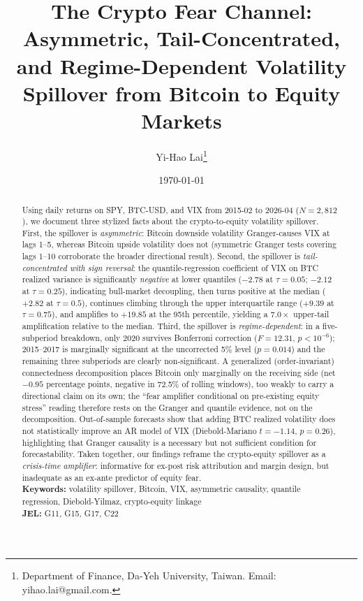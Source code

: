 \documentclass[11pt,a4paper]{article}
\title{The Crypto Fear Channel:\\ Asymmetric, Tail-Concentrated, and Regime-Dependent Volatility Spillover from Bitcoin to Equity Markets}
\author{Yi-Hao Lai\thanks{Department of Finance, Da-Yeh University, Taiwan. Email: yihao.lai@gmail.com.}}
\date{\today}
\begin{document}
\maketitle

\begin{abstract}
\noindent Using daily returns on SPY, BTC-USD, and VIX from 2015-02 to 2026-04 ($N = 2{,}812$), we document three stylized facts about the crypto-to-equity volatility spillover. First, the spillover is \emph{asymmetric}: Bitcoin downside volatility Granger-causes VIX at lags 1--5, whereas Bitcoin upside volatility does not (symmetric Granger tests covering lags 1--10 corroborate the broader directional result).%
 Second, the spillover is \emph{tail-concentrated with sign reversal}: the quantile-regression coefficient of VIX on BTC realized variance is significantly \emph{negative} at lower quantiles ($-2.78$ at $\tau = 0.05$; $-2.12$ at $\tau = 0.25$), indicating bull-market decoupling, then turns positive at the median ($+2.82$ at $\tau = 0.5$), continues climbing through the upper interquartile range ($+9.39$ at $\tau = 0.75$), and amplifies to $+19.85$ at the 95th percentile, yielding a $7.0\times$ upper-tail amplification relative to the median. Third, the spillover is \emph{regime-dependent}: in a five-subperiod breakdown, only 2020 survives Bonferroni correction ($F = 12.31$, $p < 10^{-6}$); 2015--2017 is marginally significant at the uncorrected 5\% level ($p = 0.014$) and the remaining three subperiods are clearly non-significant. A generalized (order-invariant) connectedness decomposition places Bitcoin only marginally on the receiving side (net $-0.95$ percentage points, negative in 72.5\% of rolling windows), too weakly to carry a directional claim on its own; the ``fear amplifier conditional on pre-existing equity stress'' reading therefore rests on the Granger and quantile evidence, not on the decomposition. Out-of-sample forecasts show that adding BTC realized volatility does not statistically improve an AR model of VIX (Diebold-Mariano $t = -1.14$, $p = 0.26$), highlighting that Granger causality is a necessary but not sufficient condition for forecastability. Taken together, our findings reframe the crypto-equity spillover as a \emph{crisis-time amplifier}: informative for ex-post risk attribution and margin design, but inadequate as an ex-ante predictor of equity fear. \\

\noindent\textbf{Keywords:} volatility spillover, Bitcoin, VIX, asymmetric causality, quantile regression, Diebold-Yilmaz, crypto-equity linkage \\
\textbf{JEL:} G11, G15, G17, C22
\end{abstract}
\end{document}
